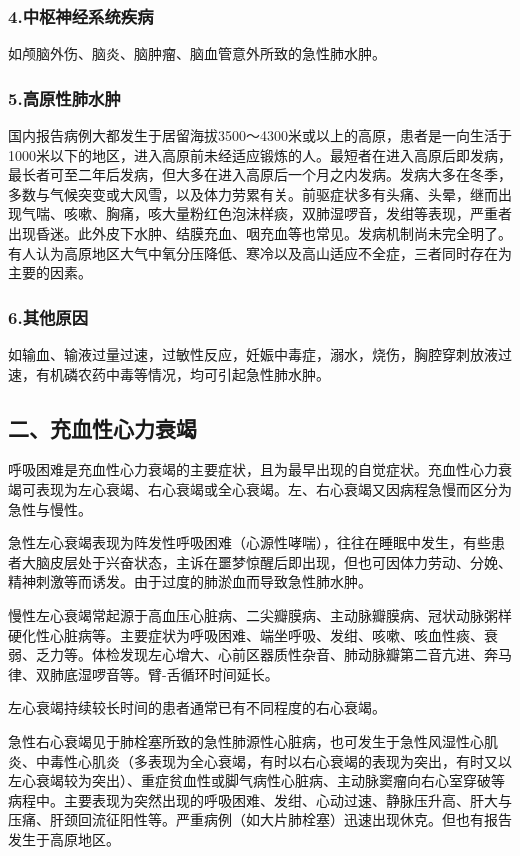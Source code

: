 \subsubsection{4.中枢神经系统疾病}

如颅脑外伤、脑炎、脑肿瘤、脑血管意外所致的急性肺水肿。

\subsubsection{5.高原性肺水肿}

国内报告病例大都发生于居留海拔3500～4300米或以上的高原，患者是一向生活于1000米以下的地区，进入高原前未经适应锻炼的人。最短者在进入高原后即发病，最长者可至二年后发病，但大多在进入高原后一个月之内发病。发病大多在冬季，多数与气候突变或大风雪，以及体力劳累有关。前驱症状多有头痛、头晕，继而出现气喘、咳嗽、胸痛，咳大量粉红色泡沫样痰，双肺湿啰音，发绀等表现，严重者出现昏迷。此外皮下水肿、结膜充血、咽充血等也常见。发病机制尚未完全明了。有人认为高原地区大气中氧分压降低、寒冷以及高山适应不全症，三者同时存在为主要的因素。

\subsubsection{6.其他原因}

如输血、输液过量过速，过敏性反应，妊娠中毒症，溺水，烧伤，胸腔穿刺放液过速，有机磷农药中毒等情况，均可引起急性肺水肿。

\subsection{二、充血性心力衰竭}

呼吸困难是充血性心力衰竭的主要症状，且为最早出现的自觉症状。充血性心力衰竭可表现为左心衰竭、右心衰竭或全心衰竭。左、右心衰竭又因病程急慢而区分为急性与慢性。

急性左心衰竭表现为阵发性呼吸困难（心源性哮喘），往往在睡眠中发生，有些患者大脑皮层处于兴奋状态，主诉在噩梦惊醒后即出现，但也可因体力劳动、分娩、精神刺激等而诱发。由于过度的肺淤血而导致急性肺水肿。

慢性左心衰竭常起源于高血压心脏病、二尖瓣膜病、主动脉瓣膜病、冠状动脉粥样硬化性心脏病等。主要症状为呼吸困难、端坐呼吸、发绀、咳嗽、咳血性痰、衰弱、乏力等。体检发现左心增大、心前区器质性杂音、肺动脉瓣第二音亢进、奔马律、双肺底湿啰音等。臂-舌循环时间延长。

左心衰竭持续较长时间的患者通常已有不同程度的右心衰竭。

急性右心衰竭见于肺栓塞所致的急性肺源性心脏病，也可发生于急性风湿性心肌炎、中毒性心肌炎（多表现为全心衰竭，有时以右心衰竭的表现为突出，有时又以左心衰竭较为突出）、重症贫血性或脚气病性心脏病、主动脉窦瘤向右心室穿破等病程中。主要表现为突然出现的呼吸困难、发绀、心动过速、静脉压升高、肝大与压痛、肝颈回流征阳性等。严重病例（如大片肺栓塞）迅速出现休克。但也有报告发生于高原地区。

